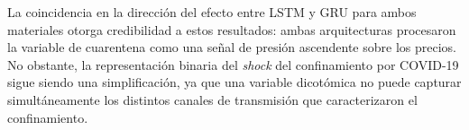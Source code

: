 \justify
La coincidencia en la dirección del efecto entre LSTM y GRU para ambos materiales otorga credibilidad a estos resultados: ambas arquitecturas procesaron la variable de cuarentena como una señal de presión ascendente sobre los precios. No obstante, la representación binaria del \textit{shock} del confinamiento por COVID-19 sigue siendo una simplificación, ya que una variable dicotómica no puede capturar simultáneamente los distintos canales de transmisión que caracterizaron el confinamiento.

